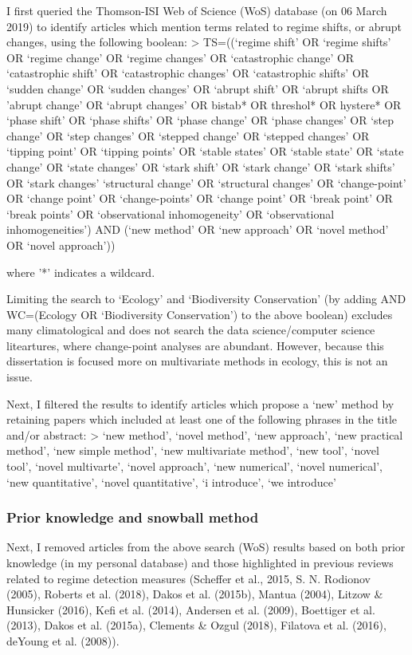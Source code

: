 \documentclass[12pt,twoside,openany]{reedthesis}
\begin{document}
I first queried the Thomson-ISI Web of Science (WoS) database (on 06
March 2019) to identify articles which mention terms related to regime
shifts, or abrupt changes, using the following boolean: \textgreater{}
TS=((`regime shift' OR `regime shifts' OR `regime change' OR `regime
changes' OR `catastrophic change' OR `catastrophic shift' OR
`catastrophic changes' OR `catastrophic shifts' OR `sudden change' OR
`sudden changes' OR `abrupt shift' OR `abrupt shifts OR 'abrupt change'
OR `abrupt changes' OR bistab* OR threshol* OR hystere* OR `phase shift'
OR `phase shifts' OR `phase change' OR `phase changes' OR `step change'
OR `step changes' OR `stepped change' OR `stepped changes' OR `tipping
point' OR `tipping points' OR `stable states' OR `stable state' OR
`state change' OR `state changes' OR `stark shift' OR `stark change' OR
`stark shifts' OR `stark changes' `structural change' OR `structural
changes' OR `change-point' OR `change point' OR `change-points' OR
`change point' OR `break point' OR `break points' OR `observational
inhomogeneity' OR `observational inhomogeneities') AND (`new method' OR
`new approach' OR `novel method' OR `novel approach'))

where '*' indicates a wildcard.

Limiting the search to `Ecology' and `Biodiversity Conservation' (by
adding AND WC=(Ecology OR `Biodiversity Conservation') to the above
boolean) excludes many climatological and does not search the data
science/computer science liteartures, where change-point analyses are
abundant. However, because this dissertation is focused more on
multivariate methods in ecology, this is not an issue.

Next, I filtered the results to identify articles which propose a `new'
method by retaining papers which included at least one of the following
phrases in the title and/or abstract: \textgreater{} `new method',
`novel method', `new approach', `new practical method', `new simple
method', `new multivariate method', `new tool', `novel tool', `novel
multivarte', `novel approach', `new numerical', `novel numerical', `new
quantitative', `novel quantitative', `i introduce', `we introduce'

\subsubsection{Prior knowledge and snowball
method}\label{prior-knowledge-and-snowball-method}

Next, I removed articles from the above search (WoS) results based on
both prior knowledge (in my personal database) and those highlighted in
previous reviews related to regime detection measures (Scheffer et al.,
2015, S. N. Rodionov (2005), Roberts et al. (2018), Dakos et al.
(2015b), Mantua (2004), Litzow \& Hunsicker (2016), Kefi et al. (2014),
Andersen et al. (2009), Boettiger et al. (2013), Dakos et al. (2015a),
Clements \& Ozgul (2018), Filatova et al. (2016), deYoung et al.
(2008)).
\end{document}
